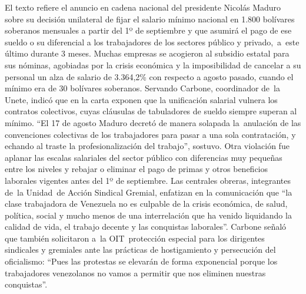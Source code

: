 \documentclass{article}%
\begin{document}
%
El texto refiere el anuncio en cadena nacional del presidente Nicolás Maduro sobre su decisión unilateral de fijar el salario mínimo nacional en 1.800 bolívares soberanos mensuales a partir del 1º de septiembre y que asumirá el pago de ese sueldo o su diferencial a los trabajadores de los sectores público y privado,~a~este último durante 3 meses.%
\newline%
%
Muchas empresas se acogieron al subsidio estatal para sus nóminas, agobiadas por la crisis económica y la imposibilidad de cancelar a su personal un alza de salario de 3.364,2\% con respecto a agosto pasado, cuando el mínimo era de 30 bolívares soberanos.%
\newline%
%
Servando Carbone, coordinador de~la Unete, indicó que en la carta exponen que la unificación salarial vulnera los contratos colectivos, cuyas cláusulas de tabuladores de sueldo siempre superan al mínimo.%
\newline%
%
“El 17 de agosto Maduro decretó de manera solapada la~anulación de las convenciones colectivas de los trabajadores para pasar a una sola contratación, y echando al traste la profesionalización del trabajo”, sostuvo.%
\newline%
%
Otra violación fue aplanar las escalas salariales del sector público con diferencias muy pequeñas entre los niveles y rebajar o eliminar el pago de primas y otros beneficios laborales vigentes antes del 1º de septiembre.%
\newline%
%
Las centrales obreras, integrantes de~la Unidad~de Acción Sindical Gremial, enfatizan en la comunicación que “la clase trabajadora de Venezuela no es culpable de la crisis económica, de salud, política, social y mucho menos de una interrelación que ha venido liquidando la calidad de vida, el trabajo decente y las conquistas laborales”.%
\newline%
%
Carbone señaló que también solicitaron a~la OIT~protección especial para los dirigentes sindicales y gremiales ante las prácticas de hostigamiento y persecución del oficialismo: “Pues las protestas se elevarán de forma exponencial porque los trabajadores venezolanos no vamos a permitir que nos eliminen nuestras conquistas”.%
\newline%
%
\end{document}
